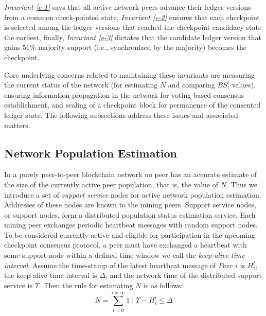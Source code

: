 \textit{Invariant \ref{e-1}} says that all active network peers advance their ledger versions from a common check-pointed state, \textit{Invariant \ref{e-2}} ensures that each checkpoint is selected among the ledger versions that reached the checkpoint candidacy state the earliest, finally, \textit{Invariant \ref{e-3}} dictates that the candidate ledger version that gains $51\%$ majority support (i.e., synchronized by the majority) becomes the checkpoint. 

Core underlying concerns related to maintaining these invariants are measuring the current status of the network (for estimating $N$ and comparing $BS_i^t$ values), ensuring information propagation in the network for voting based consensus establishment, and sealing of a checkpoint block for permanence of the consented ledger state. The following subsections address these issues and associated matters.    

\subsection{Network Population Estimation}
In a purely peer-to-peer blockchain network no peer has an accurate estimate of the size of the currently active peer population, that is, the value of $N$. Thus we introduce a set of \textit{support service} nodes for active network population estimation. Addresses of these nodes are known to the mining peers. Support service nodes, or support nodes, form a distributed population status estimation service. Each mining peer exchanges periodic heartbeat messages with random support nodes. To be considered currently active and eligible for participation in the upcoming checkpoint consensus protocol, a peer must have exchanged a heartbeat with some support node within a defined time window we call the \textit{keep-alive time interval}. Assume the time-stamp of the latest heartbeat message of $Peer$ $i$ is $H_i^t$, the keep-alive time interval is $\Delta$, and the network time of the distributed support service is $\Upsilon$. Then the rule for estimating $N$ is as follows:  
\begin{equation}
\label{e-4}
N = \sum_{i = 0}^{i = \infty}{1 \mid \Upsilon - H_i^t \leq \Delta}
\end{equation}

